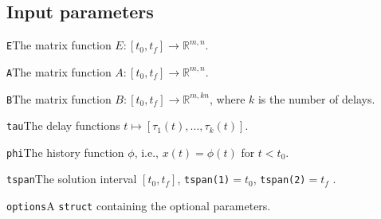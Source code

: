\documentclass[final,reqno]{siamltex}
\renewenvironment{itemize}[1]{\begin{compactitem}#1}{\end{compactitem}}
\begin{document}
\subsection{Input parameters}
\begin{itemize}
\item {\tt E}\quad The matrix function $E:[t_0,t_f]\rightarrow \mathbb{R}^{m,n}$.
\item {\tt A}\quad The matrix function $A:[t_0,t_f]\rightarrow \mathbb{R}^{m,n}$.
\item {\tt B}\quad The matrix function $B:[t_0,t_f]\rightarrow \mathbb{R}^{m,kn}$, where $k$ is the number of delays.
\item {\tt tau}\quad  The delay functions $t\mapsto [\tau_1(t),\ldots,\tau_k(t)]$.
\item {\tt phi}\quad The history function $\phi$, i.e.,  $x(t)=\phi(t)$ for $t < t_0$.
\item {\tt tspan}\quad The solution interval $[t_0,t_f]$, {\tt tspan(1)}$ = t_0$, {\tt tspan(2)}$ = t_f$ .
\item {\tt options}\quad A {\tt struct} containing the optional parameters.
\end{itemize}
\end{document}

